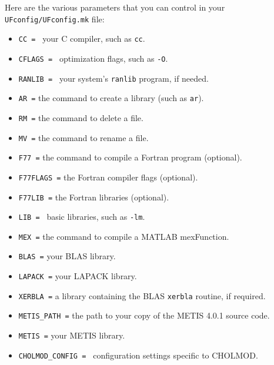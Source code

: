 \documentclass[11pt]{article}
\begin{document}
\noindent
Here are the various parameters that you can control in your {\tt UFconfig/UFconfig.mk} file:
\begin{itemize}
\item {\tt CC = } your C compiler, such as {\tt cc}.
\item {\tt CFLAGS = } optimization flags, such as {\tt -O}.
\item {\tt RANLIB = } your system's {\tt ranlib} program, if needed.
\item {\tt AR =} the command to create a library (such as {\tt ar}).
\item {\tt RM =} the command to delete a file.
\item {\tt MV =} the command to rename a file.
\item {\tt F77 =} the command to compile a Fortran program (optional).
\item {\tt F77FLAGS =} the Fortran compiler flags (optional).
\item {\tt F77LIB =} the Fortran libraries (optional).
\item {\tt LIB = } basic libraries, such as {\tt -lm}.
\item {\tt MEX =} the command to compile a MATLAB mexFunction.
\item {\tt BLAS =} your BLAS library.
\item {\tt LAPACK =} your LAPACK library.
\item {\tt XERBLA =} a library containing the BLAS {\tt xerbla} routine, if required.
\item {\tt METIS\_PATH =} the path to your copy of the METIS 4.0.1 source code.
\item {\tt METIS =} your METIS library.
\item {\tt CHOLMOD\_CONFIG = } configuration settings specific to CHOLMOD.
\end{itemize}
\end{document}

